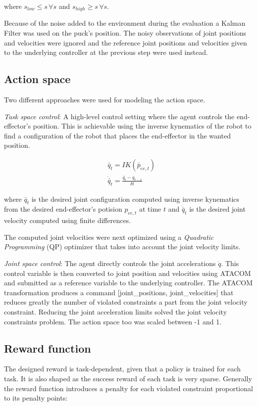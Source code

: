 where $s_{low} \le s \,\forall s$ and $s_{high} \ge s\,\forall s$.

Because of the noise added to the environment during the evaluation a Kalman Filter \cite{kalman_filter} was used on the puck's position.
The noisy observations of joint positions and velocities were ignored and the reference joint positions and velocities given to the underlying controller at the previous step were used instead.

\subsection{Action space}
Two different approaches were used for modeling the action space.

\textit{Task space control}:
A high-level control setting where the agent controls the end-effector's position. This is achievable using the inverse kynematics of the robot
to find a configuration of the robot that places the end-effector in the wanted position.

\begin{equation*}
    \begin{aligned}
        &\bar{q}_t = IK(\bar{p}_{ee,t}) \\
        &\dot{\bar{q}}_t = \frac{\bar{q}_t - q_{t-1}}{\delta t}
    \end{aligned}
\end{equation*}

where $\bar{q}_t$ is the desired joint configuration computed using inverse kynematics from the desired end-effector's potision $p_{ee,t}$ at time $t$ and
$\dot{\bar{q}}_t$ is the desired joint velocity computed using finite differences.

The computed joint velocities were next optimized using a \textit{Quadratic Programming} (QP) optimizer that takes into account the joint velocity limits.

\textit{Joint space control}:
The agent directly controls the joint accelerations $\ddot{q}$. This control variable is then converted to joint position and velocities using ATACOM \cite{Atacom} and submitted as a reference variable
to the underlying controller. The ATACOM transformation produces a command [joint\_positions, joint\_velocities] that reduces greatly the number of violated constraints a part from the joint velocity constraint.
Reducing the joint acceleration limits solved the joint velocity constraints problem. The action space too was scaled between -1 and 1.


\subsection{Reward function}
The designed reward is task-dependent, given that a policy is trained for each task. It is also shaped as the success reward of each task is very sparse.
Generally the reward function introduces a penalty for each violated constraint proportional to its penalty points:

